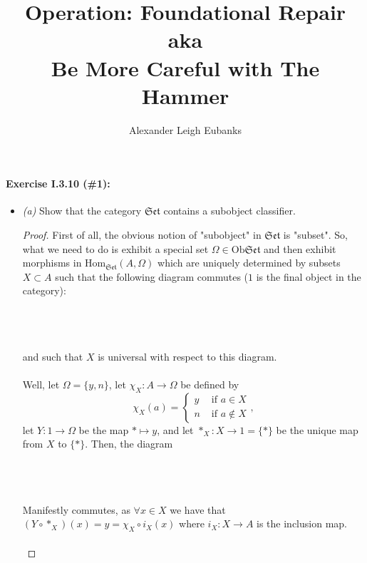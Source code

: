 \documentclass[12pt,letterpaper]{article}
\author{Alexander Leigh Eubanks }
\title{Operation: Foundational Repair\\ aka\\ Be More Careful with The Hammer}
\newcommand{\Hom}{\mathrm{Hom}}
\begin{document}
\maketitle
\paragraph{Exercise I.3.10 (\#1):}  
\begin{itemize}
	\item\textit{(a)} Show that the category $\mathfrak{Set}$ contains a subobject classifier. 
	\begin{proof}
		First of all, the obvious notion of "subobject" in $\mathfrak{Set}$ is "subset". So, what we need to do is exhibit a special set $\Omega \in \mathrm{Ob }\mathfrak{Set}$ and then exhibit morphisms in $\Hom_{\mathfrak{Set}}(A,\Omega)$ which are uniquely determined by subsets $X \subset A$ such that the following diagram commutes ($1$ is the final object in the category):\\\\
		\\\\
		and such that $X$ is universal with respect to this diagram.\\\\
		Well, let $\Omega = \{y,n\}$, let $\chi_X : A \rightarrow \Omega$ be defined by
		\[
			\chi_X(a) = 	\begin{cases}
							y & \text{ if } a \in X\\
							n & \text{ if } a \not\in X
						\end{cases},
		\]
		let $Y : 1 \rightarrow \Omega$ be the map $* \mapsto y$, and let $ *_X : X \rightarrow 1 = \{*\}$ be the unique map from $X$ to $\{*\}$. Then, the diagram\\\\
		\\\\
		
		Manifestly commutes, as $\forall x\in X$ we have that $(Y\circ *_X)(x) = y = \chi_X \circ i_X(x)$ where $i_X:X \rightarrow A$ is the inclusion map.\\\\
		

\end{proof}
\end{itemize}
\end{document}

